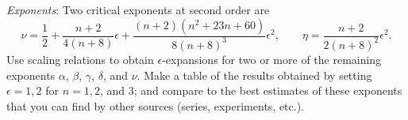 \begin{problem}
    \textit{Exponents}: Two critical exponents at second order are
    \[
        \nu = \frac{1}{2} + \frac{n+2}{4(n+8)}\epsilon + \frac{(n+2)(n^2+23n+60)}{8(n+8)^3}\epsilon^2,
        \qquad
        \eta = \frac{n+2}{2(n+8)^2}\epsilon^2.
    \]
    Use scaling relations to obtain $\epsilon$-expansions for two or more of the remaining exponents $\alpha$, $\beta$, $\gamma$, $\delta$, and $\nu$. Make a table of the results obtained by setting $\epsilon = 1, 2$ for $n = 1, 2$, and $3$; and compare to the best estimates of these exponents that you can find by other sources (series, experiments, etc.).
\end{problem}

\begin{solution}
\end{solution}

